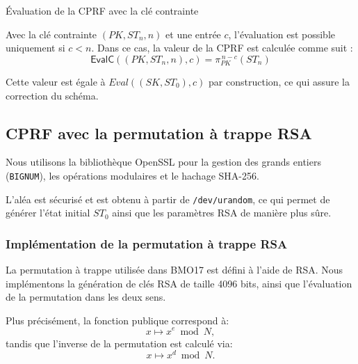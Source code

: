 \documentclass[9pt]{extarticle}
\begin{document}
\begin{defbox}{Évaluation de la CPRF avec la clé contrainte}
    
Avec la clé contrainte $(PK, ST_n, n)$ et une entrée $c$, l’évaluation est possible uniquement si
$c < n$.
Dans ce cas, la valeur de la CPRF est calculée comme suit :
\[
\textsf{EvalC}((PK, ST_n, n), c) = \pi_{PK}^{\,n-c}(ST_n)
\]

Cette valeur est égale à $Eval((SK, ST_0), c)$ par construction, ce qui assure la correction du schéma.

\begin{center}
\end{center}

\end{defbox}



\subsection{CPRF avec la permutation à trappe RSA}

Nous utilisons la bibliothèque OpenSSL pour la gestion des grands entiers
(\texttt{BIGNUM}), les opérations modulaires et le hachage SHA-256.

L’aléa est sécurisé et est obtenu à partir de \texttt{/dev/urandom}, ce qui
permet de générer l’état initial $ST_0$ ainsi que les paramètres RSA de manière plus sûre.


\subsubsection{Implémentation de la permutation à trappe RSA}

La permutation à trappe utilisée dans BMO17 est défini à l’aide de RSA.
Nous implémentons la génération de clés RSA de taille 4096 bits, ainsi que l’évaluation
de la permutation dans les deux sens.

Plus précisément, la fonction publique correspond à:
\[
x \mapsto x^e \bmod N,
\]
tandis que l’inverse de la permutation est calculé via:
\[
x \mapsto x^d \bmod N.
\]
\end{document}
